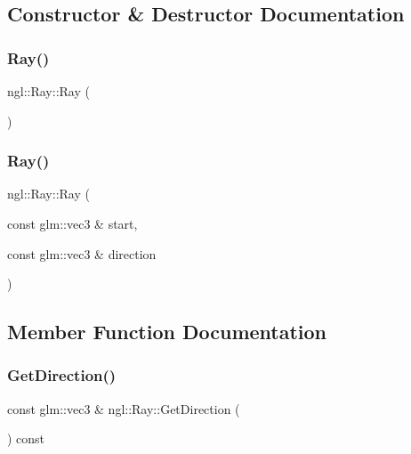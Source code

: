 \subsection{Constructor \& Destructor Documentation}
\mbox{\label{classngl_1_1_ray_a4521e3bf3f7bdfc1e3215a5a901511d9}} 
\subsubsection{\texorpdfstring{Ray()}{Ray()}\hspace{0.1cm}{\footnotesize\ttfamily [1/2]}}
{\footnotesize\ttfamily ngl\+::\+Ray\+::\+Ray (\begin{DoxyParamCaption}{ }\end{DoxyParamCaption})\hspace{0.3cm}{\ttfamily [explicit]}}

\mbox{\label{classngl_1_1_ray_a7731d619427f23005dd82b6f96888f32}} 
\subsubsection{\texorpdfstring{Ray()}{Ray()}\hspace{0.1cm}{\footnotesize\ttfamily [2/2]}}
{\footnotesize\ttfamily ngl\+::\+Ray\+::\+Ray (\begin{DoxyParamCaption}\item[{const glm\+::vec3 \&}]{start,  }\item[{const glm\+::vec3 \&}]{direction }\end{DoxyParamCaption})\hspace{0.3cm}{\ttfamily [explicit]}}



\subsection{Member Function Documentation}
\mbox{\label{classngl_1_1_ray_afaa6a7f1af5c55d587db215b3fc48cc4}} 
\subsubsection{\texorpdfstring{Get\+Direction()}{GetDirection()}}
{\footnotesize\ttfamily const glm\+::vec3 \& ngl\+::\+Ray\+::\+Get\+Direction (\begin{DoxyParamCaption}{ }\end{DoxyParamCaption}) const}

